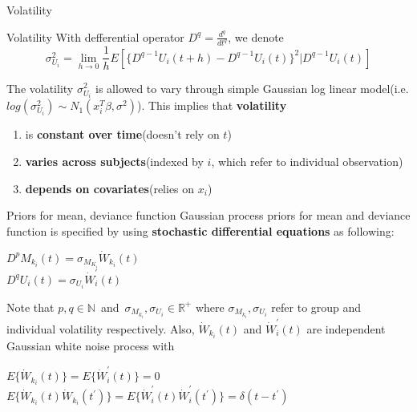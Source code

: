 \documentclass[10pt]{beamer}
\def\dev{U_i(t)}
\def\vol{\sigma_{U_i}^2}
\begin{document}
\begin{frame}[t]{Volatility}
\vspace{4pt}
\begin{block}{Volatility}
\vspace{0.5em}
With defferential operator $D^q=\displaystyle\frac{d^q}{dt^q}$, we denote\\
$$\vol=\lim\limits_{h \to 0}\displaystyle\frac{1}{h}E[\{D^{q-1}U_i(t+h)-D^{q-1}\dev\}^2|D^{q-1}\dev]$$
\vspace{0.5em}
\end{block}
The volatility $\vol$ is allowed to vary through simple Gaussian log linear model(i.e. $log(\vol)\sim N_1(x_{i}^{T}\beta,\sigma^2)$). This implies that \textbf{volatility}
\begin{enumerate}
\item is \textbf{constant over time}(doesn't rely on $t$)
\item \textbf{varies across subjects}(indexed by $i$, which refer to individual observation)
\item \textbf{depends on covariates}(relies on $x_i$)
\end{enumerate}
\end{frame}


\begin{frame}[t]{Priors for mean, deviance function}
\vspace{4pt}
Gaussian process priors for mean and deviance function is specified by using \textbf{stochastic differential equations} as following:
\begin{center}
    $D^pM_{k_i}(t)=\sigma_{M_{K_i}}\dot{W}_{k_i}(t)$\\
    $D^qU_i(t)=\sigma_{U_i}\dot{W}_{i}^{'}(t)$
\end{center}
Note that $p, q \in \mathbb{N}$\ and\  $\sigma_{M_{k_i}}, \sigma_{U_i} \in \mathbb{R}^+$ where $\sigma_{M_{k_i}}, \sigma_{U_i}$ refer to group and individual volatility respectively. Also, $\dot{W}_{k_i}(t)$ and $\dot{W}_{i}^{'}(t)$ are independent Gaussian white noise process with
\begin{center}
    $E\{\dot{W}_{k_i}(t)\}=E\{\dot{W}_{i}^{'}(t)\}=0$\\
    $E\{\dot{W}_{k_i}(t)\dot{W}_{k_i}(t^{'})\}=E\{\dot{W}_{i}^{'}(t)\dot{W}_{i}^{'}(t^{'})\}=\delta(t-t^{'})$
\end{center}
\end{frame}
\end{document}
